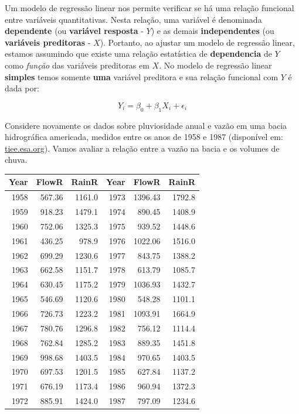 \documentclass[
]{book}
\begin{document}
Um modelo de regressão linear nos permite verificar se há uma relação funcional entre variáveis quantitativas. Nesta relação, uma variável é denominada \textbf{dependente} (ou \textbf{variável resposta} - \(Y\)) e as demais \textbf{independentes} (ou \textbf{variáveis preditoras} - \(X\)). Portanto, ao ajustar um modelo de regressão linear, estamos assumindo que existe uma relação estatística de \textbf{dependencia} de \(Y\) como \emph{função} das variáveis preditoras em \(X\). No modelo de regressão linear \textbf{simples} temos somente \textbf{uma} variável preditora e sua relação funcional com \(Y\) é dada por:

\[Y_i = \beta_0 + \beta_1X_i + \epsilon_i\]

Considere novamente os dados sobre pluviosidade anual e vazão em uma bacia hidrográfica americada, medidos entre os anos de 1958 e 1987 (disponível em: \href{https://tiee.esa.org/vol/v1/data_sets/hubbard/hubbard_overview.html}{tiee.esa.org}). Vamos avaliar a relação entre a vazão na bacia e os volumes de chuva.

\begin{tabular}{r|r|r|r|r|r}
\hline
Year & FlowR & RainR & Year & FlowR & RainR\\
\hline
1958 & 567.36 & 1161.0 & 1973 & 1396.43 & 1792.8\\
\hline
1959 & 918.23 & 1479.1 & 1974 & 890.45 & 1408.9\\
\hline
1960 & 752.06 & 1325.3 & 1975 & 939.52 & 1448.6\\
\hline
1961 & 436.25 & 978.9 & 1976 & 1022.06 & 1516.0\\
\hline
1962 & 699.29 & 1230.6 & 1977 & 843.75 & 1388.2\\
\hline
1963 & 662.58 & 1151.7 & 1978 & 613.79 & 1085.7\\
\hline
1964 & 630.45 & 1175.2 & 1979 & 1036.93 & 1432.7\\
\hline
1965 & 546.69 & 1120.6 & 1980 & 548.28 & 1101.1\\
\hline
1966 & 726.73 & 1223.2 & 1981 & 1093.91 & 1664.9\\
\hline
1967 & 780.76 & 1296.8 & 1982 & 756.12 & 1114.4\\
\hline
1968 & 762.84 & 1285.2 & 1983 & 889.35 & 1451.8\\
\hline
1969 & 998.68 & 1403.5 & 1984 & 970.65 & 1403.5\\
\hline
1970 & 697.53 & 1201.5 & 1985 & 627.84 & 1137.2\\
\hline
1971 & 676.19 & 1173.4 & 1986 & 960.94 & 1372.3\\
\hline
1972 & 885.91 & 1424.0 & 1987 & 797.09 & 1234.6\\
\hline
\end{tabular}
\end{document}
